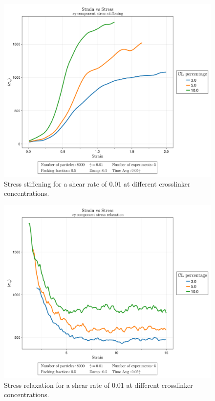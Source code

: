 \begin{figure}[ht!]
    \centering
    \includegraphics[width=\textwidth]{figs/ComputaitonalResults/stiff_dgamma10Stress.png}
    \caption{Stress stiffening for a shear rate of \num{0.01} at different crosslinker concentrations.}
\end{figure}

\begin{figure}[ht!]
    \centering
    \includegraphics[width=\textwidth]{figs/ComputaitonalResults/srlx_dgamma10Stress.png}
    \caption{Stress relaxation for a shear rate of \num{0.01} at different crosslinker concentrations.}
\end{figure}



